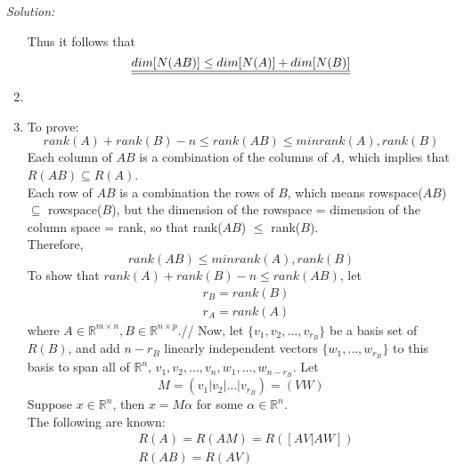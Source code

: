 \documentclass[fleqn]{article}
\newenvironment{solution}
    {\textit{Solution:}}
    {}
\begin{document}
\begin{solution}
\begin{enumerate}[label=(\alph*)]
    Thus it follows that 
    \begin{equation*}
        \underline{\underline{dim[N(AB)] \leq dim[N(A)] + dim[N(B)]}}\\
    \end{equation*}

    \item
    \item To prove:
    \begin{equation*}
        rank(A) + rank(B) - n \leq rank(AB) \leq min{rank(A), rank(B)}
    \end{equation*}
    Each column of $AB$ is a combination of the columns of $A$, which implies that $R(AB) \subseteq R(A)$.\\
    Each row of $AB$ is a combination the rows of $B$, which means rowspace($AB$) $\subseteq$ rowspace($B$), but the dimension of the rowspace = dimension of the column space = rank, so that rank($AB$) $\leq$ rank($B$).\\
    Therefore,
    \begin{equation*}
        rank(AB) \leq min{rank(A), rank(B)}
    \end{equation*}
    To show that $rank(A) + rank(B) - n \leq rank(AB)$, let
    \begin{equation*}
        \begin{split}
            &r_B = rank(B)\\
            &r_A = rank(A)
        \end{split} 
    \end{equation*}
    where $A \in \mathbb{R}^{m \times n}, B \in \mathbb{R}^{n \times p}$.//
    Now, let $\{v_1, v_2, \dots, v_{r_B}\}$ be a basis set of $R(B)$, and add $n - r_B$ linearly independent vectors $\{w_1, \dots, w_{r_B}\}$ to this basis to span all of $\mathbb{R}^{n}$, {$v_1, v_2, \dots, v_n, w_1, \dots, w_{n-r_B}$}.
    Let 
    \begin{equation*}
       M = (v_1 | v_2 | \dots | v_{r_B}) = (V W)
    \end{equation*}
    Suppose $x \in \mathbb{R}^{n}$, then $x = M\alpha$ for some $\alpha \in \mathbb{R}^{n}$.\\
    The following are known:
    \begin{equation*}
        \begin{split}
            &R(A) = R(AM) = R([AV|AW])\\
            &R(AB) = R(AV)
        \end{split}
    \end{equation*}

\end{enumerate}
\end{solution}
\end{document}
